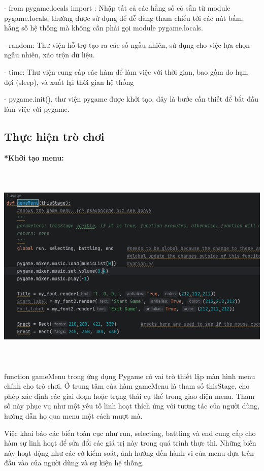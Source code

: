\documentclass[a4paper]{article}
\begin{document}
        - from pygame.locals import : Nhập tất cả các hằng số có sẵn từ module pygame.locals, thường được sử dụng để dễ dàng tham chiếu tới các nút bấm, hằng số hệ thống mà không cần phải gọi module pygame.locals.

        - random: Thư viện hỗ trợ tạo ra các số ngẫu nhiên, sử dụng cho việc lựa chọn ngẫu nhiên, xáo trộn dữ liệu.

        - time: Thư viện cung cấp các hàm để làm việc với thời gian, bao gồm đo hạn, đợi (sleep), và xuất lại thời gian hệ thống

        - pygame.init(), thư viện pygame được khởi tạo, đây là bước cần thiết để bắt đầu làm việc với pygame.



	\subsection{Thực hiện trò chơi }
	\textbf{*Khởi tạo menu:}
 
        \includegraphics[width=15cm,height=10cm]{imgcodemenu.png}

        function gameMenu trong ứng dụng Pygame có vai trò thiết lập màn hình menu chính cho trò chơi. Ở trung tâm của hàm gameMenu là tham số thisStage, cho phép xác định các giai đoạn hoặc trạng thái cụ thể trong giao diện menu. Tham số này phục vụ như một yếu tố linh hoạt thích ứng với tương tác của người dùng, hướng dẫn họ qua menu một cách mượt mà.

        Việc khai báo các biến toàn cục như run, selecting, battling và end cung cấp cho hàm sự linh hoạt để sửa đổi các giá trị này trong quá trình thực thi. Những biến này hoạt động như các cờ kiểm soát, ảnh hưởng đến hành vi của menu dựa trên đầu vào của người dùng và sự kiện hệ thống.
\end{document}
